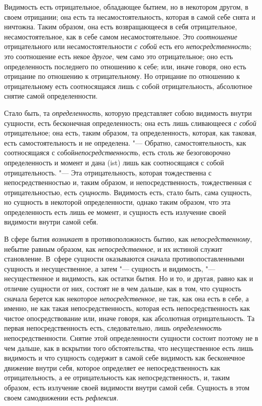 Видимость есть отрицательное, обладающее бытием, но в некотором другом, в
своем отрицании; она есть та несамостоятельность, которая в самой себе
снята и ничтожна. Таким образом, она есть возвращающееся в себя
отрицательное, несамостоятельное, как в себе самом несамостоятельное. Это
{\em соотношение} отрицательного или
несамостоятельности {\em с собой} есть его
{\em непосредственность}; это соотношение есть некое
{\em другое}, чем само это отрицательное; оно есть
определенность последнего по отношению к себе; или, иначе говоря, оно есть
отрицание по отношению к отрицательному. Но отрицание по отношению к
отрицательному есть соотносящаяся лишь с собой отрицательность, абсолютное
снятие самой определенности.

Стало быть, та {\em определенность}, которую
представляет собою видимость внутри сущности, есть бесконечная
определенность; она есть лишь сливающееся {\em с собой}
отрицательное; она есть, таким образом, та определенность, которая, как
таковая, есть самостоятельность и не определена. "--- Обратно,
самостоятельность, как соотносящаяся с собой{\em непосредственность},
есть столь же безоговорочно определенность и момент и
дана (ist) лишь как соотносящаяся с собой отрицательность. "--- Эта
отрицательность, которая тождественна с непосредственностью и, таким
образом, и непосредственность, тождественная с отрицательностью, есть
{\em сущность}. Видимость есть, стало быть, сама
сущность, но сущность в некоторой определенности, однако таким образом, что
эта определенность есть лишь ее момент, и сущность есть излучение своей
видимости внутри самой себя.

В сфере бытия {\em возникает} в противоположность бытию,
как {\em непосредственному}, небытие равным образом,
как {\em непосредственное}, и их истиной служит становление. В~сфере
сущности оказываются сначала противопоставленными сущность и несущественное,
а затем "--- сущность и видимость, "--- несущественное
и видимость, как остатки бытия. Но и то, и другая, равно как и отличие
сущности от них, состоят не в чем дальше, как в том, что сущность сначала
берется как некоторое {\em непосредственное}, не так,
как она есть в себе, а именно, не как такая непосредственность, которая
есть непосредственность как чистое опосредствование или, иначе говоря, как
абсолютная отрицательность. Та первая непосредственность есть,
следовательно, лишь {\em определенность}
непосредственности. Снятие этой определенности сущности состоит поэтому не
в чем дальше, как в вскрытии того обстоятельства, что несущественное есть
лишь видимость и что сущность содержит в самой себе видимость как
бесконечное движение внутри себя, которое определяет ее непосредственность
как отрицательность, а ее отрицательность как непосредственность, и, таким
образом, есть излучение своей видимости внутри самой себя. Сущность в этом
своем самодвижении есть {\em рефлексия}.

